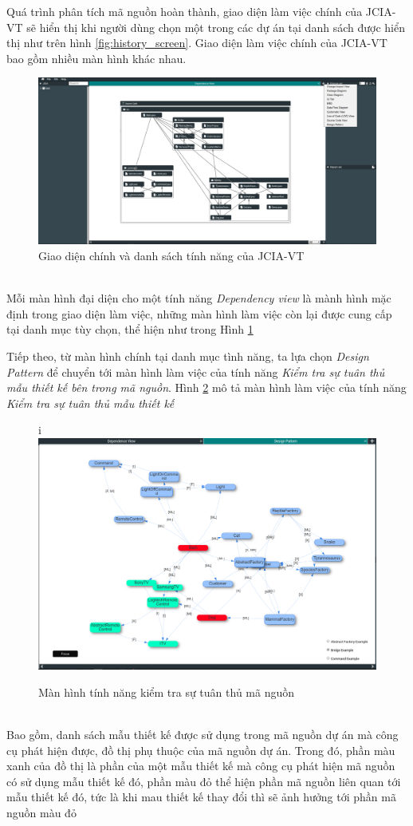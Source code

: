 \documentclass[12pt]{report}
\begin{document}
Quá trình phân tích mã nguồn hoàn thành, giao diện làm việc chính của JCIA-VT sẽ hiển thị khi người dùng chọn một trong các dự án tại danh sách được hiển thị như trên hình \ref{fig:history_screen}. Giao diện làm việc chính của JCIA-VT bao gồm nhiều màn hình khác nhau.
\begin{figure}[h]
	\centering
	\includegraphics[scale=0.25]{images/main_screen}
	\caption{Giao diện chính và danh sách tính năng của JCIA-VT}
	\label{fig:main_screen}
\end{figure}\\
Mỗi màn hình đại diện cho một tính năng \textit{Dependency view} là mành hình mặc định trong giao diện làm việc, những màn hình làm việc còn lại được cung cấp tại danh mục tùy chọn, thể hiện như trong Hình \ref{fig:main_screen}

\noindent Tiếp theo, từ màn hình chính tại danh mục tình năng, ta lựa chọn \textit{Design Pattern} để chuyển tới màn hình làm việc của tính năng \textit{Kiểm tra sự tuân thủ mẫu thiết kế bên trong mã nguồn}. Hình \ref{fig:design_pattern_workspace} mô tả màn hình làm việc của tính năng \textit{Kiểm tra sự tuân thủ mẫu thiết kế}
\begin{figure}[h]i
	\centering
	\includegraphics[scale=0.34]{images/design_pattern_workspace}
	\caption{Màn hình tính năng kiểm tra sự tuân thủ mã nguồn}
	\label{fig:design_pattern_workspace}
\end{figure}\\
Bao gồm, danh sách mẫu thiết kế được sử dụng trong mã nguồn dự án mà công cụ phát hiện được, đồ thị phụ thuộc của mã nguồn dự án. Trong đó, phần màu xanh của đồ thị là phần của một mẫu thiết kế mà công cụ phát hiện mã nguồn có sử dụng mẫu thiết kế đó, phần màu đỏ thể hiện phần mã nguồn liên quan tới mẫu thiết kế đó, tức là khi mau thiết kế thay đổi thì sẽ ảnh hưởng tới phần mã nguồn màu đỏ
\end{document}
